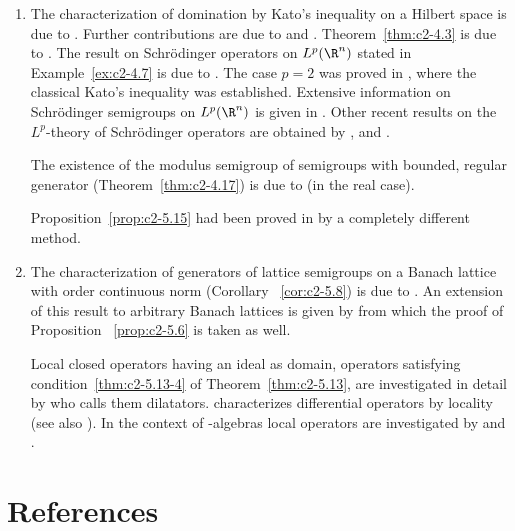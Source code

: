 \begin{enumerate}[label=\emph{Section \arabic*:}, wide]
\item  The characterization of domination by Kato's inequality on a Hilbert space is due to \textcite{simon:1977}. Further contributions are due to \textcite{hessetal:1977} and \textcite{kishimotorobinson:1980}. Theorem~\ref{thm:c2-4.3} is due to \textcite{arendt:1984b}. The result on Schrödinger operators on $L^p(\R^n)$ stated in Example~\ref{ex:c2-4.7} is due to \textcite{kato:1986}. The case $p = 2$ was proved in \textcite{kato:1973}, where the classical Kato's inequality was established. Extensive information on Schrödinger semigroups on $L^p(\R^n)$ is given in \textcite{simon:1982}. Other recent results on the $L^p$-theory of Schrödinger operators are obtained by \textcite{davies:1986}, \textcite{okazawa:1984} and \textcite{voigt:1984a}.

The existence of the modulus semigroup of semigroups with bounded, regular generator (Theorem~\ref{thm:c2-4.17}) is due to \textcite{derndinger:1984} (in the real case).

Proposition~\ref{prop:c2-5.15}   had been proved in \textcite{schaeferetal:1978} by a completely different method.
 
\item  
The characterization of generators of lattice semigroups on a Banach lattice with order continuous norm (Corollary ~\ref{cor:c2-5.8}) is due to \textcite{nageluhlig:1981}. An extension of this result to arbitrary Banach lattices is given by \textcite{arendt:1982} from which the proof of  Proposition ~\ref{prop:c2-5.6}   is taken as well.

Local closed operators having an ideal as domain, \ie operators satisfying condition~\ref{thm:c2-5.13-4} of Theorem~\ref{thm:c2-5.13}, are investigated in detail by \textcite{nakano:1950} who calls them dilatators. \textcite{peetre:1959} characterizes differential operators by locality (see also \textcite{luxemburg:1979}). In the context of \CA-algebras local operators are investigated by \textcite{battyrobinson:1984} and \textcite{battyrobinson:1985}.

\end{enumerate}
\section*{References}
{\RaggedRight
  \printbibliography[heading=none]
 }
